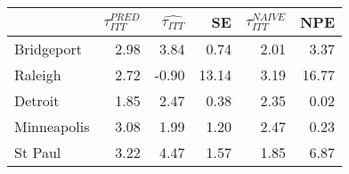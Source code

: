
\begin{tabular}{lrrrrr}
\toprule
  & $\tau_{ITT}^{PRED}$ & $\hat{\tau_{ITT}}$ & SE & $\tau_{ITT}^{NAIVE}$ & NPE\\
\midrule
Bridgeport & 2.98 & 3.84 & 0.74 & 2.01 & 3.37\\
Raleigh & 2.72 & -0.90 & 13.14 & 3.19 & 16.77\\
Detroit & 1.85 & 2.47 & 0.38 & 2.35 & 0.02\\
Minneapolis & 3.08 & 1.99 & 1.20 & 2.47 & 0.23\\
St Paul & 3.22 & 4.47 & 1.57 & 1.85 & 6.87\\
\bottomrule
\end{tabular}